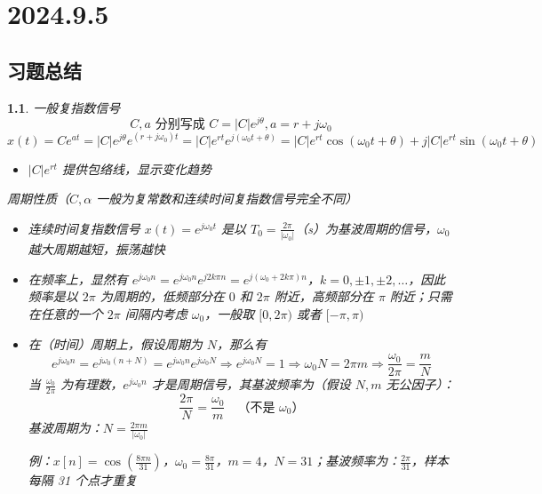 \documentclass[UTF8]{report}
\theoremstyle{MyLineTheoremStyle} %
\theoremstyle{MyBlockTheoremStyle} %
\theoremstyle{MySubsubsectionStyle} %
\newtheorem{definition}{}
\begin{document}
\chapter{2024.9.5}\thispagestyle{fancy}

\section{习题总结}

\begin{definition}
    一般复指数信号
        \[
        C, a \text{ 分别写成 } C = |C|e^{j\theta}, a = r + j\omega_0
        \]
        \[
        x(t) = Ce^{at} = |C| e^{j\theta} e^{(r + j\omega_0)t} = |C| e^{rt} e^{j(\omega_0 t + \theta)} = |C| e^{rt} \cos(\omega_0 t + \theta) + j |C| e^{rt} \sin(\omega_0 t + \theta)
        \]
        \begin{itemize}
            \item $|C| e^{rt}$ 提供包络线，显示变化趋势
        \end{itemize}

        周期性质（$C, \alpha$ 一般为复常数和连续时间复指数信号完全不同）
        \begin{itemize}
            \item 连续时间复指数信号 $x(t) = e^{j\omega_0 t}$ 是以 $T_0 = \frac{2\pi}{|\omega_0|}$（s）为基波周期的信号，$\omega_0$ 越大周期越短，振荡越快
            \item 在频率上，显然有 $e^{j\omega_0 n} = e^{j\omega_0 n} e^{j2k\pi n} = e^{j(\omega_0 + 2k\pi)n}$，$k = 0, \pm1, \pm2, \ldots$，因此频率是以 $2\pi$ 为周期的，低频部分在 $0$ 和 $2\pi$ 附近，高频部分在 $\pi$ 附近；只需在任意的一个 $2\pi$ 间隔内考虑 $\omega_0$，一般取 $[0, 2\pi)$ 或者 $[-\pi, \pi)$
            \item 在（时间）周期上，假设周期为 $N$，那么有
            \[
            e^{j\omega_0 n} = e^{j\omega_0 (n+N)} = e^{j\omega_0 n} e^{j\omega_0 N} \Rightarrow e^{j\omega_0 N} = 1 \Rightarrow \omega_0 N = 2\pi m \Rightarrow \frac{\omega_0}{2\pi} = \frac{m}{N}
            \]
            当 $\frac{\omega_0}{2\pi}$ 为有理数，$e^{j\omega_0 n}$ 才是周期信号，其基波频率为（假设 $N, m$ 无公因子）：
            \[
            \frac{2\pi}{N} = \frac{\omega_0}{m} \quad \text{（不是 $\omega_0$）}
            \]
            基波周期为：$N = \frac{2\pi m}{|\omega_0|}$

            例：$x[n] = \cos\left(\frac{8\pi n}{31}\right)$，$\omega_0 = \frac{8\pi}{31}$，$m = 4$，$N = 31$；基波频率为：$\frac{2\pi}{31}$，样本每隔 31 个点才重复
        \end{itemize}
\end{definition}
\end{document}
